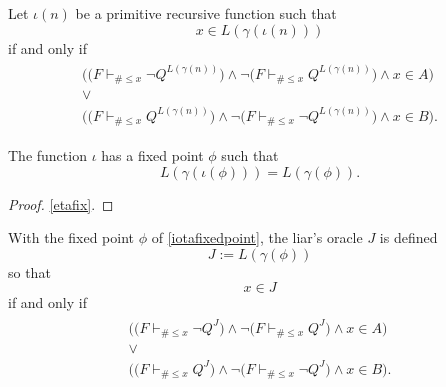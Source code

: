 \documentclass[letterpaper]{article}
\newcommand{\Theorem}{\raisebox{0.5ex}{\large\Beam}}
\begin{document}
\begin{construction}
Let $\iota(n)$ be a primitive recursive function such that
\begin{equation}
x\in L(\gamma(\iota(n)))
\end{equation}
if and only if
\begin{align}
\begin{gathered}\label{oiota1}
\Big(\big(F\vdash_{\#\le x}\lnot Q^{L(\gamma(n))}\big)
\land\lnot\big(F\vdash_{\#\le x}Q^{L(\gamma(n))}\big)
\land x\in A\Big) \\
\lor\\
\Big(\big(F\vdash_{\#\le x}Q^{L(\gamma(n))}\big)
\land\lnot\big(F\vdash_{\#\le x}\lnot Q^{L(\gamma(n))}\big)
\land x\in B\Big).
\end{gathered}
\end{align}
\end{construction}
\begin{theorem}\label{iotafixedpoint}
The function $\iota$ has a fixed point $\phi$ such that
\begin{equation}
	L(\gamma(\iota(\phi)))=L(\gamma(\phi)).
\end{equation}
\end{theorem}
\begin{proof}
	\Theorem \ref{etafix}.
\end{proof}
\begin{construction}
With the fixed point $\phi$ of \Theorem \ref{iotafixedpoint}, the liar's oracle $J$ is defined
\begin{equation}
J:=L(\gamma(\phi))
\end{equation}
so that
\begin{equation}\label{siota0}
x\in J
\end{equation}
if and only if
\begin{align}
\begin{gathered}\label{siota1}
\Big(\big(F\vdash_{\#\le x}\lnot Q^J\big)
\land\lnot\big(F\vdash_{\#\le x}Q^J\big)
\land x\in A\Big) \\
\lor\\
\Big(\big(F\vdash_{\#\le x}Q^J\big)
\land\lnot\big(F\vdash_{\#\le x}\lnot Q^J\big)
\land x\in B\Big).
\end{gathered}
\end{align}
\end{construction}
\end{document}
